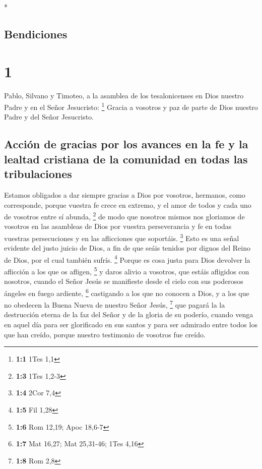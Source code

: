 \begin{paracol}{2} \switchcolumn[0]*

\hypertarget{bendiciones}{%
\subsection{Bendiciones}\label{bendiciones}}

\hypertarget{section}{%
\section{1}\label{section}}

 Pablo, Silvano y Timoteo, a la asamblea de los
tesalonicenses en Dios nuestro Padre y en el Señor Jesucristo:
\footnote{\textbf{1:1} 1Tes 1,1}  Gracia a vosotros y paz
de parte de Dios nuestro Padre y del Señor Jesucristo.

\hypertarget{acciuxf3n-de-gracias-por-los-avances-en-la-fe-y-la-lealtad-cristiana-de-la-comunidad-en-todas-las-tribulaciones}{%
\subsection{Acción de gracias por los avances en la fe y la lealtad
cristiana de la comunidad en todas las
tribulaciones}\label{acciuxf3n-de-gracias-por-los-avances-en-la-fe-y-la-lealtad-cristiana-de-la-comunidad-en-todas-las-tribulaciones}}

 Estamos obligados a dar siempre gracias a Dios por
vosotros, hermanos, como corresponde, porque vuestra fe crece en
extremo, y el amor de todos y cada uno de vosotros entre sí abunda,
\footnote{\textbf{1:3} 1Tes 1,2-3}  de modo que nosotros
mismos nos gloriamos de vosotros en las asambleas de Dios por vuestra
perseverancia y fe en todas vuestras persecuciones y en las aflicciones
que soportáis. \footnote{\textbf{1:4} 2Cor 7,4}  Esto es
una señal evidente del justo juicio de Dios, a fin de que seáis tenidos
por dignos del Reino de Dios, por el cual también sufrís. \footnote{\textbf{1:5}
  Fil 1,28}  Porque es cosa justa para Dios devolver la
aflicción a los que os afligen, \footnote{\textbf{1:6} Rom 12,19; Apoc
  18,6-7}  y daros alivio a vosotros, que estáis afligidos
con nosotros, cuando el Señor Jesús se manifieste desde el cielo con sus
poderosos ángeles en fuego ardiente, \footnote{\textbf{1:7} Mat 16,27;
  Mat 25,31-46; 1Tes 4,16}  castigando a los que no
conocen a Dios, y a los que no obedecen la Buena Nueva de nuestro Señor
Jesús, \footnote{\textbf{1:8} Rom 2,8}  que pagará la la
destrucción eterna de la faz del Señor y de la gloria de su poderío,
 cuando venga en aquel día para ser glorificado en sus
santos y para ser admirado entre todos los que han creído, porque
nuestro testimonio de vosotros fue creído.


\end{paracol}
